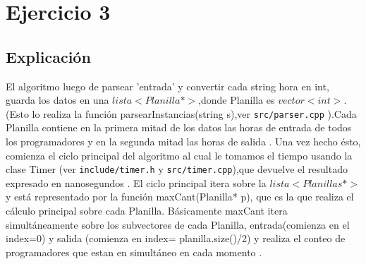 \section{Ejercicio 3}

\subsection{Explicación}

El algoritmo luego de parsear 'entrada' y convertir cada string hora en  int, guarda los datos  en una \emph{$lista< Planilla*>$},donde Planilla es \emph{$vector<int>$}. (Esto lo realiza la función parsearInstancias(string s),ver \texttt{src/parser.cpp} ).Cada Planilla contiene en la primera mitad de los datos las horas de entrada de todos los programadores y en la segunda mitad las horas de salida .
\newline
Una vez hecho ésto, comienza el ciclo principal del algoritmo al cual le tomamos el tiempo usando la clase Timer (ver \texttt{include/timer.h} y \texttt{src/timer.cpp}),que devuelve el resultado expresado en nanosegundos .
\newline
El ciclo principal  itera sobre la \emph{$lista<Planillas*>$}  y  está representado por la función maxCant(Planilla* p), que es la que realiza el cálculo principal sobre cada Planilla.
\newline
Básicamente maxCant itera simultáneamente sobre los subvectores de cada Planilla, entrada(comienza en el index=0) y salida (comienza en index= planilla.size()/2) y realiza el conteo de programadores que estan en simultáneo en cada momento .

